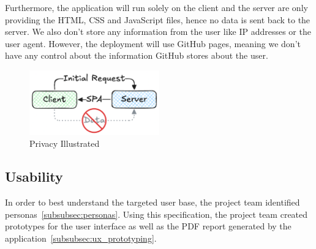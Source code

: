 Furthermore, the application will run solely on the client and the server are only providing the HTML,
CSS and JavaScript files, hence no data is sent back to the server.
We also don't store any information from the user like IP addresses or the user agent.
However, the deployment will use GitHub pages, meaning we don't have any control about the information GitHub stores about the user.

\begin{figure}[H]
    \centering
    \includegraphics[width=0.5\textwidth]{../assets/privacy_illustrated.png}
    \caption{Privacy Illustrated}\label{fig:privacy_illustrated}
\end{figure}

\subsection{Usability}\label{subsec:usability}
In order to best understand the targeted user base, the project team identified personas~\ref{subsubsec:personas}.
Using this specification, the project team created prototypes for the user interface as well as the PDF report generated by the application~\ref{subsubsec:ux_prototyping}.

